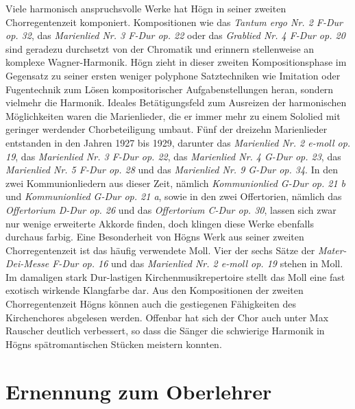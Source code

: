 \documentclass{book}
\begin{document}
Viele harmonisch anspruchsvolle Werke hat Högn in seiner zweiten
Chorregentenzeit komponiert. Kompositionen wie das \textit{Tantum
ergo Nr. 2 F-Dur} \textit{op. 32}, das \textit{Marienlied Nr. 3 F-Dur
op. 22} oder das \textit{Grablied Nr. 4 F-Dur op. 20} sind geradezu
durchsetzt von der Chromatik und erinnern stellenweise an komplexe
Wagner-Harmonik. Högn zieht in dieser zweiten Kompositionsphase im
Gegensatz zu seiner ersten weniger polyphone Satztechniken wie
Imitation oder Fugentechnik zum Lösen kompositorischer
Aufgabenstellungen heran, sondern vielmehr die Harmonik. Ideales
Betätigungsfeld zum Ausreizen der harmonischen Möglichkeiten waren die
Marienlieder, die er immer mehr zu einem Sololied mit geringer
werdender Chorbeteiligung umbaut. Fünf der dreizehn Marienlieder
entstanden in den Jahren 1927 bis 1929, darunter das \textit{Marienlied
Nr. 2 e-moll op. 19}, das \textit{Marienlied Nr. 3 F-Dur op. 22}, das
\textit{Marienlied Nr. 4 G-Dur op. 23}, das \textit{Marienlied Nr. 5
F-Dur op. 28} und das \textit{Marienlied Nr. 9 G-Dur op. 34}. In den
zwei Kommunionliedern aus dieser Zeit, nämlich
\textit{Kommu}\textit{nionlied G-Dur op. 21 b} und
\textit{Kommunionlied G-Dur op. 21 a}, sowie in den zwei Offertorien,
nämlich das \textit{Offertorium D-Dur op. 26} und das
\textit{Offertorium C-Dur op. 30}, lassen sich zwar nur wenige
erweiterte Akkorde finden, doch klingen diese Werke ebenfalls durchaus
farbig. Eine Besonderheit von Högns Werk aus seiner zweiten
Chorregentenzeit ist das häufig verwendete Moll. Vier der sechs Sätze
der \textit{Mater-Dei-Messe F-Dur op. 16} und das \textit{Marienlied
Nr. 2 e-moll op. 19} stehen in Moll. Im damaligen stark Dur-lastigen
Kirchenmusikrepertoire stellt das Moll eine fast exotisch wirkende
Klangfarbe dar. Aus den Kompositionen der zweiten Chorregentenzeit
Högns können auch die gestiegenen Fähigkeiten des Kirchenchores
abgelesen werden. Offenbar hat sich der Chor auch unter Max Rauscher
deutlich verbessert, so dass die Sänger die schwierige Harmonik in
Högns spätromantischen Stücken meistern konnten.

\section{Ernennung zum Oberlehrer}
\end{document}
